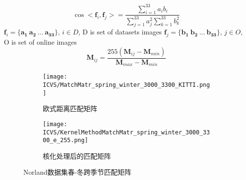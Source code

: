 \begin{equation}
\label{tab:cosine} 
\cos <\mathbf f_i,\mathbf f_j> = \frac{\displaystyle\sum_{i=1}^{33} a_i b_i}{\displaystyle\sum_{j=1}^{33} a_j^2 \displaystyle\sum_{k=1}^{33}b_k^2}
\end{equation}
$\mathbf f_i=\{\mathbf{{a}_1\ {a}_2\ ... \ {a}_{33}}\}$,  $i\in D$, D is set of datasets images
$\mathbf f_j=\{\mathbf{{b}_1\ {b}_2\ ... \ {b}_{33}}\}$,  $j\in O$, O is set of online images
\begin{equation}
\label{tab:normalization}
\mathbf{M}_{ij}=\frac{255\left(\mathbf{M}_{ij}-\mathbf{M}_{min}\right)}{\mathbf{M}_{max}-\mathbf{M}_{min}}
\end{equation}
\begin{figure}[h]
\centering
\begin{subfigure}[t]{0.23\textwidth} 
  \texttt{[image: ICVS/MatchMatr\_spring\_winter\_3000\_3300\_KITTI.png]}
  \caption{欧式距离匹配矩阵}
  \label{fig:KernelBefore}
\end{subfigure}
\begin{subfigure}[t]{0.23\textwidth} 
  \texttt{[image: ICVS/KernelMethodMatchMatr\_spring\_winter\_3000\_3300\_e\_255.png]}
  \caption{核化处理后的匹配矩阵}
  \label{fig:KernelAfter}
\end{subfigure}
\caption{Norland数据集春-冬跨季节匹配矩阵}
\label{fig:KernelMatrix}
\end{figure}


